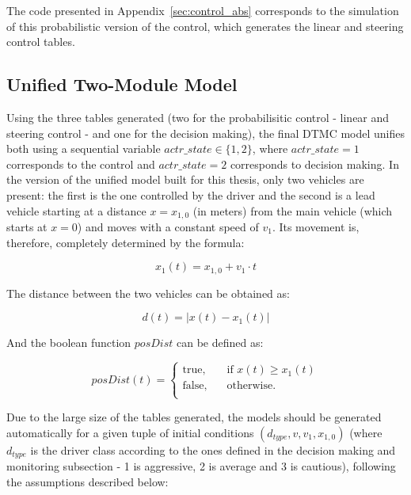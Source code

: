 The code presented in Appendix~\ref{sec:control_abs} corresponds to the simulation of this probabilistic version of the control, which generates the linear and steering control tables.

\subsection{Unified Two-Module Model}

Using the three tables generated (two for the probabilisitic control - linear and steering control - and one for the decision making), the final DTMC model unifies both using a sequential variable $actr\_state \in \{1,2\}$, where $actr\_state = 1$ corresponds to the control and $actr\_state = 2$ corresponds to decision making. In the version of the unified model built for this thesis, only two vehicles are present: the first is the one controlled by the driver and the second is a lead vehicle starting at a distance $x = x_{1,0}$ (in meters) from the main vehicle (which starts at $x=0$) and moves with a constant speed of $v_1$. Its movement is, therefore, completely determined by the formula:

\begin{equation}
	x_1(t) = x_{1,0} + v_1\cdot t
\end{equation}

The distance between the two vehicles can be obtained as:

\begin{equation}
	d(t) = \lvert x(t) - x_1(t) \rvert
\end{equation}

And the boolean function $posDist$ can be defined as:

\begin{equation}
posDist(t) = 
     \begin{cases}
       \text{true,} &\quad\text{if }x(t) \geq x_1(t)\\
       \text{false,} &\quad\text{otherwise.} \\
     \end{cases}
\end{equation}

Due to the large size of the tables generated, the models should be generated automatically for a given tuple of initial conditions $(d_{type}, v, v_1, x_{1,0})$ (where $d_{type}$ is the driver class according to the ones defined in the decision making and monitoring subsection - 1 is aggressive, 2 is average and 3 is cautious), following the assumptions described below:

